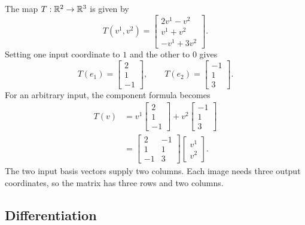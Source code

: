\begin{example}
  \label{ex:linear-algebra-i:two-to-three-coordinate-map}
  \begin{pendingreview}
  The map \(T:\mathbb{R}^2\to\mathbb{R}^3\) is given by
  \[
    T(v^1,v^2)=
      \begin{bmatrix}2v^1-v^2\\v^1+v^2\\-v^1+3v^2\end{bmatrix}.
  \]
  Setting one input coordinate to \(1\) and the other to \(0\) gives
  \[
    T(e_1)=\begin{bmatrix}2\\1\\-1\end{bmatrix},\qquad
    T(e_2)=\begin{bmatrix}-1\\1\\3\end{bmatrix}.
  \]
  For an arbitrary input, the component formula becomes
  \[
    \begin{aligned}
      T(v)&=v^1\begin{bmatrix}2\\1\\-1\end{bmatrix}
             +v^2\begin{bmatrix}-1\\1\\3\end{bmatrix}\\
        &=\begin{bmatrix}2&-1\\1&1\\-1&3\end{bmatrix}
          \begin{bmatrix}v^1\\v^2\end{bmatrix}.
    \end{aligned}
  \]
  The two input basis vectors supply two columns. Each image needs three
  output coordinates, so the matrix has three rows and two columns.
  \end{pendingreview}
\end{example}

\subsection{Differentiation}

